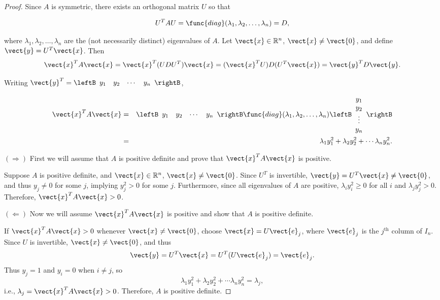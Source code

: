 \begin{proof}
Since $A$ is symmetric, there exists an orthogonal matrix $U$ so that

\[ U^{T}AU=\func{diag}(\lambda_1,\lambda_2,\ldots,\lambda_n)=D,\]

where $\lambda_1,\lambda_2,\ldots,\lambda_n$ are the (not necessarily
distinct) eigenvalues of $A$.
Let $\vect{x}\in\mathbb{R}^n$, $\vect{x}\neq \vect{0}$, and define
$\vect{y}=U^T\vect{x}$.
Then
\[ \vect{x}^TA\vect{x}=\vect{x}^T(UDU^T)\vect{x}
= (\vect{x}^TU)D(U^T\vect{x})
=\vect{y}^TD\vect{y}.\]

Writing $\vect{y}^T=\leftB\begin{array}{cccc}
y_1 & y_2 & \cdots & y_n\end{array}\rightB$, 

\begin{eqnarray*}
\vect{x}^TA\vect{x} & = & 
\leftB\begin{array}{cccc} y_1 & y_2 & \cdots & y_n\end{array}\rightB
\func{diag}(\lambda_1,\lambda_2,\ldots,\lambda_n)
\leftB\begin{array}{c} y_1 \\ y_2 \\ \vdots \\ y_n\end{array}\rightB\\
& = & \lambda_1 y_1^2 + \lambda_2 y_2^2 + \cdots \lambda_n y_n^2.
\end{eqnarray*}

$(\Rightarrow)$ First we will assume that $A$ is positive definite and prove that $\vect{x}^T A \vect{x} $ is positive. 

Suppose $A$ is positive definite, and $\vect{x}\in\mathbb{R}^n$,
$\vect{x}\neq\vect{0}$.
Since $U^T$ is invertible, $\vect{y}=U^T\vect{x}\neq \vect{0}$,
and thus $y_j\neq 0$ for some $j$, implying $y_j^2>0$
for some $j$.
Furthermore, since all eigenvalues of $A$ are positive,
$\lambda_i y_i^2\geq 0$ for all $i$ and $\lambda_jy_j^2>0$.
Therefore, $\vect{x}^TA\vect{x}>0$.

$(\Leftarrow)$ Now we will assume $\vect{x}^T A \vect{x} $ is positive and show that $A$ is positive definite.

If $\vect{x}^TA\vect{x}>0$ whenever $\vect{x}\neq \vect{0}$,
choose $\vect{x}=U\vect{e}_j$, where $\vect{e}_j$ is the $j^{\mbox{th}}$
column of $I_n$.
Since $U$ is invertible, $\vect{x}\neq\vect{0}$, 
and thus
\[ \vect{y}=U^T\vect{x}=U^T(U\vect{e}_j) =\vect{e}_j.\]
Thus $y_j=1$ and $y_i=0$ when $i\neq j$, so
\[ \lambda_1 y_1^2 + \lambda_2 y_2^2 + \cdots \lambda_n y_n^2
=\lambda_j,\]
i.e., $\lambda_j=\vect{x}^TA\vect{x}>0$.
Therefore, $A$ is positive definite.
\end{proof}

